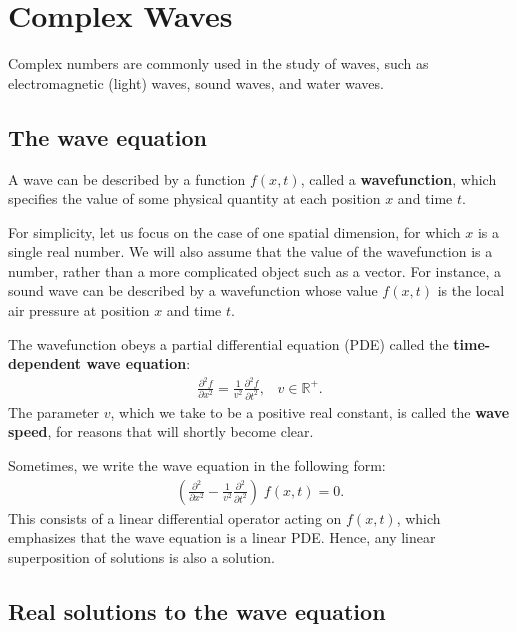 \documentclass[10pt,a4paper]{article}
\begin{document}
\setcounter{page}{40}

\section{Complex Waves}
\label{complex-waves}

Complex numbers are commonly used in the study of waves, such as
electromagnetic (light) waves, sound waves, and water waves.

\subsection{The wave equation}
\label{the-wave-equation}

A wave can be described by a function $f(x,t)$, called a
\textbf{wavefunction}, which specifies the value of some physical
quantity at each position $x$ and time $t$.

For simplicity, let us focus on the case of one spatial dimension, for
which $x$ is a single real number. We will also assume that the value
of the wavefunction is a number, rather than a more complicated object
such as a vector. For instance, a sound wave can be described by a
wavefunction whose value $f(x,t)$ is the local air pressure at
position $x$ and time $t$.

The wavefunction obeys a partial differential equation (PDE) called
the \textbf{time-dependent wave equation}:
\begin{align}
  \frac{\partial^2 f}{\partial x^2} = \frac{1}{v^2} \frac{\partial^2 f}{\partial t^2}, \;\;\; v \in\mathbb{R}^+.
\end{align}
The parameter $v$, which we take to be a positive real constant, is
called the \textbf{wave speed}, for reasons that will shortly become
clear.

Sometimes, we write the wave equation in the following form:
\begin{align}
  \left(\frac{\partial^2}{\partial x^2} - \frac{1}{v^2} \frac{\partial^2}{\partial t^2}\right) \; f(x,t) = 0.
\end{align}
This consists of a linear differential operator acting on $f(x,t)$,
which emphasizes that the wave equation is a linear PDE. Hence, any
linear superposition of solutions is also a solution.

\subsection{Real solutions to the wave equation}
\label{real-solutions-to-the-wave-equation}
\end{document}
